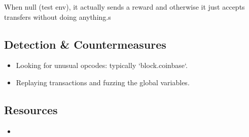 When null (test env), it actually sends a reward and otherwise it just accepts transfers without doing anything.s

\subsection{Detection \& Countermeasures}

\begin{itemize}
\item{Looking for unusual opcodes: typically `block.coinbase`.}
\item{Replaying transactions and fuzzing the global variables.}
\end{itemize}

\subsection{Resources}

\begin{itemize}
\item{\cite{article-red-pill}}
\end{itemize}
